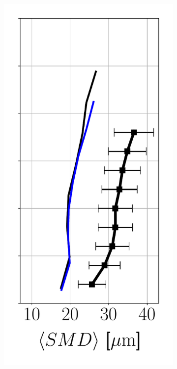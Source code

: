 \begin{figure}[h!]
\begin{subfigure}[b]{0.2\textwidth}
   \includegraphics[scale=0.35]{./part2_developments/figures_ch6_lagrangian_JICF/params_f0/profiles/SMD_along_z}
\end{subfigure}
\hspace*{0.1in}

\end{figure}
